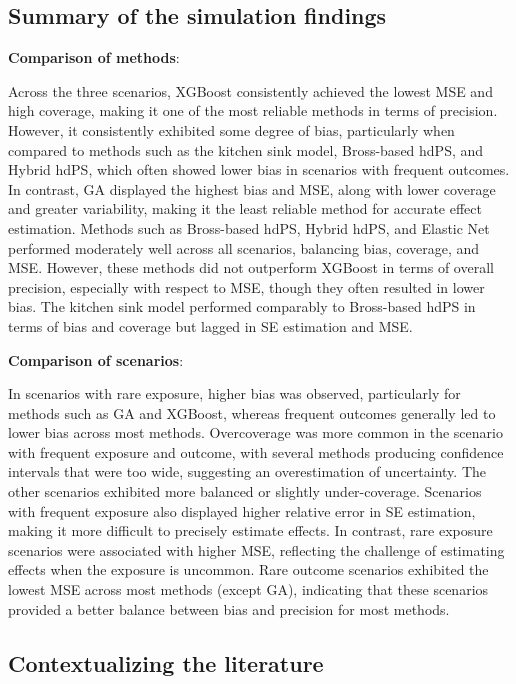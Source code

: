\documentclass[sn-vancouver,Numbered,lineno,pdflatex]{sn-jnl}
\begin{document}
\subsection{Summary of the simulation
findings}\label{summary-of-the-simulation-findings}

\textbf{Comparison of methods}:

Across the three scenarios, XGBoost consistently achieved the lowest MSE
and high coverage, making it one of the most reliable methods in terms
of precision. However, it consistently exhibited some degree of bias,
particularly when compared to methods such as the kitchen sink model,
Bross-based hdPS, and Hybrid hdPS, which often showed lower bias in
scenarios with frequent outcomes. In contrast, GA displayed the highest
bias and MSE, along with lower coverage and greater variability, making
it the least reliable method for accurate effect estimation. Methods
such as Bross-based hdPS, Hybrid hdPS, and Elastic Net performed
moderately well across all scenarios, balancing bias, coverage, and MSE.
However, these methods did not outperform XGBoost in terms of overall
precision, especially with respect to MSE, though they often resulted in
lower bias. The kitchen sink model performed comparably to Bross-based
hdPS in terms of bias and coverage but lagged in SE estimation and MSE.

\textbf{Comparison of scenarios}:

In scenarios with rare exposure, higher bias was observed, particularly
for methods such as GA and XGBoost, whereas frequent outcomes generally
led to lower bias across most methods. Overcoverage was more common in
the scenario with frequent exposure and outcome, with several methods
producing confidence intervals that were too wide, suggesting an
overestimation of uncertainty. The other scenarios exhibited more
balanced or slightly under-coverage. Scenarios with frequent exposure
also displayed higher relative error in SE estimation, making it more
difficult to precisely estimate effects. In contrast, rare exposure
scenarios were associated with higher MSE, reflecting the challenge of
estimating effects when the exposure is uncommon. Rare outcome scenarios
exhibited the lowest MSE across most methods (except GA), indicating
that these scenarios provided a better balance between bias and
precision for most methods.

\subsection{Contextualizing the
literature}\label{contextualizing-the-literature}
\end{document}
